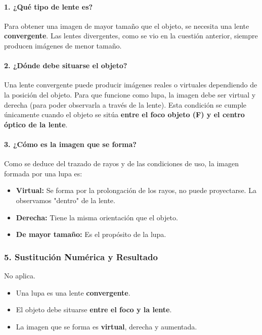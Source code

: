\paragraph{1. ¿Qué tipo de lente es?}
Para obtener una imagen de mayor tamaño que el objeto, se necesita una lente \textbf{convergente}. Las lentes divergentes, como se vio en la cuestión anterior, siempre producen imágenes de menor tamaño.

\paragraph{2. ¿Dónde debe situarse el objeto?}
Una lente convergente puede producir imágenes reales o virtuales dependiendo de la posición del objeto. Para que funcione como lupa, la imagen debe ser virtual y derecha (para poder observarla a través de la lente). Esta condición se cumple únicamente cuando el objeto se sitúa \textbf{entre el foco objeto (F) y el centro óptico de la lente}.

\paragraph{3. ¿Cómo es la imagen que se forma?}
Como se deduce del trazado de rayos y de las condiciones de uso, la imagen formada por una lupa es:
\begin{itemize}
    \item \textbf{Virtual:} Se forma por la prolongación de los rayos, no puede proyectarse. La observamos "dentro" de la lente.
    \item \textbf{Derecha:} Tiene la misma orientación que el objeto.
    \item \textbf{De mayor tamaño:} Es el propósito de la lupa.
\end{itemize}

\subsubsection*{5. Sustitución Numérica y Resultado}
No aplica.
\begin{cajaresultado}
\begin{itemize}
    \item Una lupa es una lente \textbf{convergente}.
    \item El objeto debe situarse \textbf{entre el foco y la lente}.
    \item La imagen que se forma es \textbf{virtual}, derecha y aumentada.
\end{itemize}
\end{cajaresultado}

